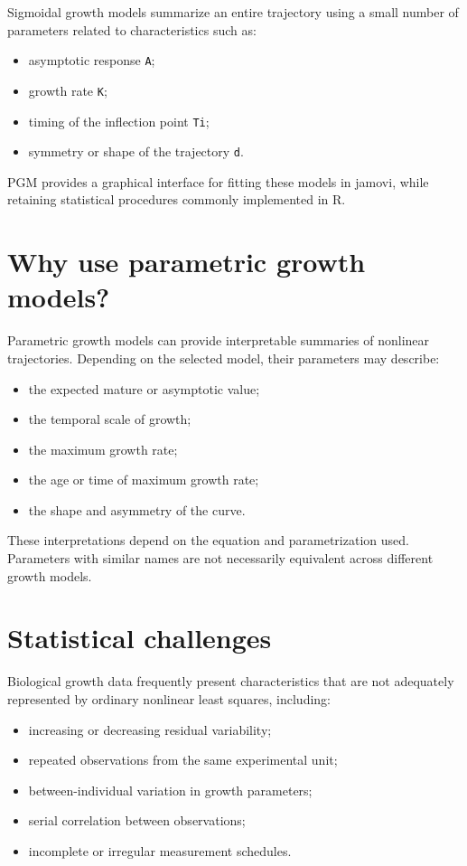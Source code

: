 \documentclass[
  english,
  letterpaper,
  DIV=11,
  numbers=noendperiod]{scrreprt}
\providecommand{\tightlist}{%
  \setlength{\itemsep}{0pt}\setlength{\parskip}{0pt}}
\begin{document}
Sigmoidal growth models summarize an entire trajectory using a small
number of parameters related to characteristics such as:

\begin{itemize}
\tightlist
\item
  asymptotic response \texttt{A};
\item
  growth rate \texttt{K};
\item
  timing of the inflection point \texttt{Ti};
\item
  symmetry or shape of the trajectory \texttt{d}.
\end{itemize}

PGM provides a graphical interface for fitting these models in jamovi,
while retaining statistical procedures commonly implemented in R.

\section{Why use parametric growth
models?}\label{why-use-parametric-growth-models}

Parametric growth models can provide interpretable summaries of
nonlinear trajectories. Depending on the selected model, their
parameters may describe:

\begin{itemize}
\tightlist
\item
  the expected mature or asymptotic value;
\item
  the temporal scale of growth;
\item
  the maximum growth rate;
\item
  the age or time of maximum growth rate;
\item
  the shape and asymmetry of the curve.
\end{itemize}

These interpretations depend on the equation and parametrization used.
Parameters with similar names are not necessarily equivalent across
different growth models.

\section{Statistical challenges}\label{statistical-challenges}

Biological growth data frequently present characteristics that are not
adequately represented by ordinary nonlinear least squares, including:

\begin{itemize}
\tightlist
\item
  increasing or decreasing residual variability;
\item
  repeated observations from the same experimental unit;
\item
  between-individual variation in growth parameters;
\item
  serial correlation between observations;
\item
  incomplete or irregular measurement schedules.
\end{itemize}
\end{document}
